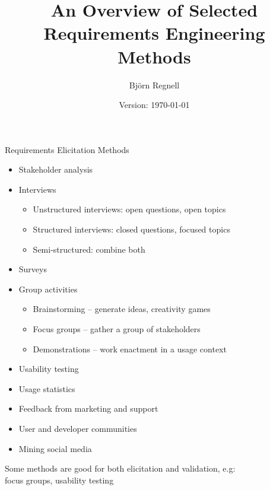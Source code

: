 \documentclass{simpleslides}
\author{Björn Regnell \\ \vspace{1em}{\small \url{https://cs.lth.se/bjorn-regnell}}}
\title{An Overview of Selected\\Requirements Engineering Methods}
\date{\footnotesize Version: \today}
\begin{document}
\maketitle

\begin{frame}[fragile]{Requirements Elicitation Methods}
\begin{itemize}
\item Stakeholder analysis
\item Interviews
\begin{itemize}
  \item Unstructured interviews: open questions, open topics
  \item Structured interviews: closed questions, focused topics
  \item Semi-structured: combine both
\end{itemize}
\item Surveys
\item Group activities
\begin{itemize}
  \item Brainstorming -- generate ideas, creativity games
  \item Focus groups -- gather a group of stakeholders
  \item Demonstrations -- work enactment in a usage context
\end{itemize}
\item Usability testing
\item Usage statistics
\item Feedback from marketing and support
\item User and developer communities
\item Mining social media
\end{itemize}
\small  Some methods are good for both elicitation and validation, e.g:\\
focus groups, usability testing
\end{frame}
  
\end{document}
